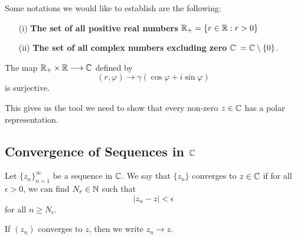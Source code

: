 \documentclass[a4paper]{report}
\begin{document}
Some notations we would like to establish are the following:
\begin{enumerate}
    \item[(i)] \textbf{The set of all positive real numbers} \( {\mathbb{R}}_{+} = \{ r \in \mathbb{R} : r > 0  \}  \)
    \item[(ii)] \textbf{The set of all complex numbers excluding zero} \( \mathbb{C}^{\cdot} =  \mathbb{C} \setminus \{ 0 \}  \).
\end{enumerate}

\begin{prop}
    The map \( {\mathbb{R}}_{+} \times \mathbb{R} \longrightarrow \mathbb{C}^{} \) defined by 
    \[  (r, \varphi) \longrightarrow \gamma ( \cos \varphi + i \sin \varphi) \]
    is surjective.
\end{prop}

\begin{remark}
    This gives us the tool we need to show that every non-zero \( z \in \mathbb{C}  \) has a polar representation.
\end{remark}

\subsection{Convergence of Sequences in \( \C \)}\label{Convergence of Sequences in the Complex Numbers}

\begin{definition}[Convergence in \( \C  \)]
    Let \( {\{ {z}_{n} \} }_{n=1}^{\infty }     \) be a sequence in \( \C  \). We say that \( \{ {z}_{n} \}   \) converges to \( z \in \mathbb{C}  \) if for all \(  \epsilon > 0  \), we can find \( {N}_{\varepsilon} \in \mathbb{N}  \) such that  
    \[  | {z}_{n} - z  |  < \epsilon \]
    for all \( n \geq {N}_{\epsilon} \).
\end{definition}

If \( ({z}_{n}) \) converges to \( z  \), then we write \( {z}_{n} \to z  \).
\end{document}
